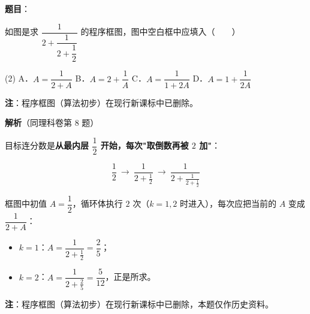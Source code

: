 \begin{answer}

\textbf{题目}：

如图是求 $\dfrac1{2+\dfrac1{2+\dfrac12}}$ 的程序框图，图中空白框中应填入\mbox{（　　）}
\nopagebreak[4]
\begin{center}\end{center}
\nopagebreak[4]
\begin{gkopts}(2)
\task A．$A=\dfrac1{2+A}$
\task B．$A=2+\dfrac1A$
\task C．$A=\dfrac1{1+2A}$
\task D．$A=1+\dfrac1{2A}$
\end{gkopts}

\begin{gktip}
\textbf{注}：程序框图（算法初步）在现行新课标中已删除。
\end{gktip}

\Needspace{0.6\textheight}

\textbf{解析}（同理科卷第 8 题）

目标连分数是\textbf{从最内层 $\dfrac12$ 开始，每次"取倒数再被 $2$ 加"}：

\nopagebreak[4]
\[\frac12\ \longrightarrow\ \frac1{2+\frac12}\ \longrightarrow\ \frac1{2+\frac1{2+\frac12}}\]

框图中初值 $A=\dfrac12$，循环体执行 $2$ 次（$k=1,2$ 时进入），每次应把当前的 $A$ 变成 $\dfrac1{2+A}$：

\begin{itemize}
\item $k=1$：$A=\dfrac1{2+\frac12}=\dfrac25$；
\item $k=2$：$A=\dfrac1{2+\frac25}=\dfrac5{12}$，正是所求。
\end{itemize}

\begin{gktip}
\textbf{注}：程序框图（算法初步）在现行新课标中已删除，本题仅作历史资料。
\end{gktip}


\par\medskip

\end{answer}
